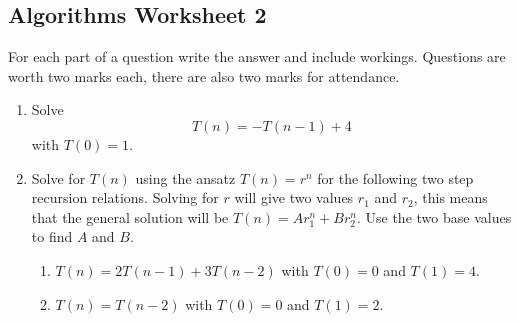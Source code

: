 \documentclass[11pt,a4paper]{scrartcl}
\newif\ifanswers
\begin{document}
\subsection*{Algorithms Worksheet 2}

For each part of a question write the answer and include
workings. Questions are worth two marks each, there are also two marks
for attendance.

\begin{enumerate}

\item Solve
\begin{equation}
T(n)=-T(n-1)+4
\end{equation}
with $T(0)=1$. 

\ifanswers

\noindent Solution:

Substitute in $T(n)=A(-1)^n+B$ to get
\begin{equation}
A(-1)^n+B=-A(-1)^{n-1}-B+4
\end{equation}
so $2B=4$ or $B=2$; now $T(n)=A(-1)^n+2$ so $1=T(0)=A+2$ and hence $A=-1$.

\fi

\item Solve for $T(n)$ using the ansatz $T(n)=r^n$ for the following
  two step recursion relations. Solving for $r$ will give two values
  $r_1$ and $r_2$, this means that the general solution will be
  $T(n)=Ar_1^n+Br_2^n$. Use the two base values to find $A$ and $B$. 

\begin{enumerate}
\item $T(n)=2T(n-1)+3T(n-2)$ with $T(0)=0$ and $T(1)=4$.
\item $T(n)=T(n-2)$ with $T(0)=0$ and $T(1)=2$.
\end{enumerate}


\ifanswers 

\noindent Solution:

For (a) we have 
\begin{equation}
r^2=2r+3
\end{equation}
so $r^2-2r-3=0$ or $(r-3)(r+1)=0$ so
\begin{equation}
T(n)=3^nA+(-1)^nB
\end{equation}
and the initial conditions give $A+B=0$ and $3A-B=4$ so 
\begin{equation}
T(n)=3^n-(-1)^n
\end{equation}
For (b) we get $r^2=1$ so 
\begin{equation}
T(n)=A+(-1)^nB
\end{equation}
and the initial conditions give $A+B=0$ and $A-B=2$ so
\begin{equation}
T(n)=1-(-1)^n
\end{equation}
\fi


\end{enumerate}
\end{document}
